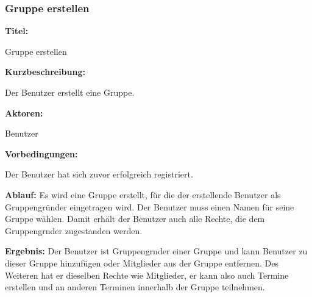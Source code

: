 \documentclass{scrartcl}
\begin{document}
	\subsubsection{Gruppe erstellen}
	\begin{description}
		\item \textbf{Titel:}
		\begin{description}
			\item Gruppe erstellen
		\end{description}
		\item \textbf{Kurzbeschreibung:}
		\begin{description}
			\item Der Benutzer erstellt eine Gruppe.
		\end{description}
		\item \textbf{Aktoren:}
		\begin{description}
			\item Benutzer 
		\end{description}
		\item \textbf{Vorbedingungen:}
		\begin{description}
			\item Der Benutzer hat sich zuvor erfolgreich registriert.
		\end{description}
		\item \textbf{Ablauf:} \newline Es wird eine Gruppe erstellt, für die der erstellende Benutzer als Gruppengründer eingetragen wird. Der Benutzer muss einen Namen für seine Gruppe wählen. Damit erhält der Benutzer auch alle Rechte, die dem \gls{Gruppengrnder} zugestanden werden. 
		\item \textbf{Ergebnis:} \newline Der Benutzer ist \gls{Gruppengrnder} einer Gruppe und kann Benutzer zu dieser Gruppe hinzufügen oder Mitglieder aus der Gruppe entfernen. Des Weiteren hat er dieselben Rechte wie Mitglieder, er kann also auch Termine erstellen und an anderen Terminen innerhalb der Gruppe teilnehmen.
	\end{description}
	
	\newpage
	
\end{document}
